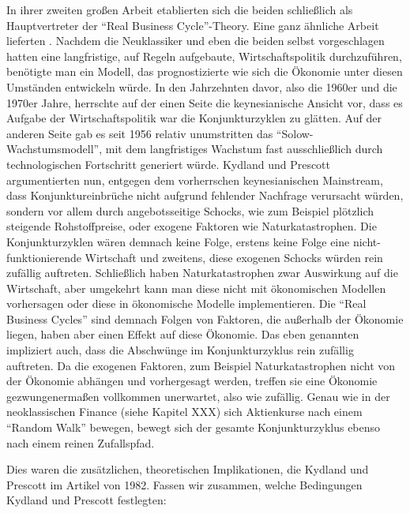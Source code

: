 In ihrer zweiten großen Arbeit \parencite{Kydland1982} etablierten sich die beiden schließlich als Hauptvertreter der "`Real Business Cycle"'-Theory. Eine ganz ähnliche Arbeit lieferten \textcite{Plosser1983}. Nachdem die Neuklassiker und eben die beiden selbst \parencite{Kydland1977} vorgeschlagen hatten eine langfristige, auf Regeln aufgebaute, Wirtschaftspolitik durchzuführen, benötigte man ein Modell, das prognostizierte wie sich die Ökonomie unter diesen Umständen entwickeln würde. In den Jahrzehnten davor, also die 1960er und die 1970er Jahre, herrschte auf der einen Seite die keynesianische Ansicht vor, dass es Aufgabe der Wirtschaftspolitik war die Konjunkturzyklen zu glätten. Auf der anderen Seite gab es seit 1956 relativ unumstritten das "`Solow-Wachstumsmodell"', mit dem langfristiges Wachstum fast ausschließlich durch technologischen Fortschritt generiert würde.
Kydland und Prescott argumentierten nun, entgegen dem vorherrschen keynesianischen Mainstream, dass Konjunktureinbrüche nicht aufgrund fehlender Nachfrage verursacht würden, sondern vor allem durch angebotsseitige Schocks, wie zum Beispiel plötzlich steigende Rohstoffpreise, oder exogene Faktoren wie Naturkatastrophen. Die Konjunkturzyklen wären demnach keine Folge, erstens keine Folge eine nicht-funktionierende Wirtschaft und zweitens, diese exogenen Schocks würden rein zufällig auftreten. Schließlich haben Naturkatastrophen zwar Auswirkung auf die Wirtschaft, aber umgekehrt kann man diese nicht mit ökonomischen Modellen vorhersagen oder diese in ökonomische Modelle implementieren. Die "`Real Business Cycles"' sind demnach Folgen von Faktoren, die außerhalb der Ökonomie liegen, haben aber einen Effekt auf diese Ökonomie. Das eben genannten impliziert auch, dass die Abschwünge im Konjunkturzyklus rein zufällig auftreten. Da die exogenen Faktoren, zum Beispiel Naturkatastrophen nicht von der Ökonomie abhängen und vorhergesagt werden, treffen sie eine Ökonomie gezwungenermaßen vollkommen unerwartet, also wie zufällig. Genau wie in der neoklassischen Finance (siehe Kapitel XXX) sich Aktienkurse nach einem "`Random Walk"' bewegen, bewegt sich der gesamte Konjunkturzyklus ebenso nach einem reinen Zufallspfad.

Dies waren die zusätzlichen, theoretischen Implikationen, die Kydland und Prescott im Artikel von 1982. Fassen wir zusammen, welche Bedingungen Kydland und Prescott festlegten:

